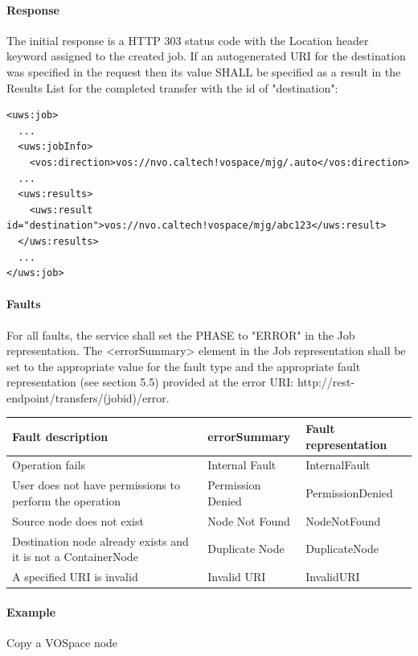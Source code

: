 \documentclass[11pt,a4paper]{ivoa}
\begin{document}
\paragraph{Response}
The initial response is a HTTP 303 status code with the Location header keyword assigned to the created job.
If an autogenerated URI for the destination was specified in the request then its value SHALL be specified as a result in the Results List for the completed transfer with the id of "destination":

\begin{lstlisting}
<uws:job>
  ...
  <uws:jobInfo>
    <vos:direction>vos://nvo.caltech!vospace/mjg/.auto</vos:direction>
  ...
  <uws:results>
    <uws:result id="destination">vos://nvo.caltech!vospace/mjg/abc123</uws:result>
  </uws:results>
  ...
</uws:job>
\end{lstlisting}

\paragraph{Faults}
For all faults, the service shall set the PHASE to "ERROR" in the Job representation. The <errorSummary> element in the Job representation shall be set to the appropriate value for the fault type and the appropriate fault representation (see section 5.5) provided at the error URI: http://rest-endpoint/transfers/(jobid)/error.

\vspace{3mm}
\begin{tabular}{ p{5cm} l p{4cm} }
\textbf{Fault description} & \textbf{errorSummary} & \textbf{Fault representation} \\
\hline
Operation fails & Internal Fault & InternalFault \\
\hline
User does not have permissions to perform the operation & Permission Denied & PermissionDenied \\
\hline
Source node does not exist & Node Not Found & NodeNotFound \\
\hline
Destination node already exists and it is not a ContainerNode & Duplicate Node & DuplicateNode \\
\hline
A specified URI is invalid & Invalid URI & InvalidURI \\
\hline
\end{tabular}
\vspace{3mm}

\paragraph{Example}
Copy a VOSpace node
\end{document}
